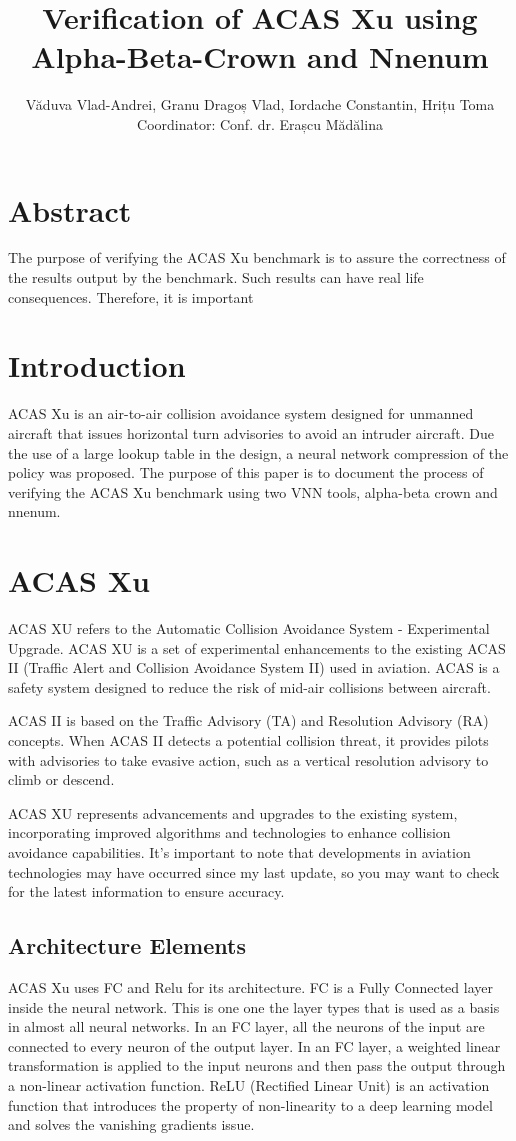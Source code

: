 \documentclass{article}
\title{Verification of ACAS Xu using Alpha-Beta-Crown and Nnenum }
\author{Văduva Vlad-Andrei, Granu Dragoș Vlad, Iordache Constantin, Hrițu Toma\\[1cm]{\small Coordinator: Conf. dr. Erașcu Mădălina}}
\begin{document}
\maketitle
\newpage
\tableofcontents
\clearpage
\section{Abstract}
The purpose of verifying the ACAS Xu benchmark is to assure the correctness of the results output by the benchmark. Such results can have real life consequences. Therefore, it is important 
\section{Introduction}
ACAS Xu is an air-to-air collision avoidance system designed for unmanned aircraft that issues horizontal turn advisories to avoid an intruder aircraft. Due the use of a large lookup table in the design, a neural network compression of the policy was proposed. The purpose of this paper is to document the process of verifying the ACAS Xu benchmark using two VNN tools, alpha-beta crown and nnenum.
\section{ACAS Xu }
ACAS XU refers to the Automatic Collision Avoidance System - Experimental Upgrade. ACAS XU is a set of experimental enhancements to the existing ACAS II (Traffic Alert and Collision Avoidance System II) used in aviation. ACAS is a safety system designed to reduce the risk of mid-air collisions between aircraft.

ACAS II is based on the Traffic Advisory (TA) and Resolution Advisory (RA) concepts. When ACAS II detects a potential collision threat, it provides pilots with advisories to take evasive action, such as a vertical resolution advisory to climb or descend.

ACAS XU represents advancements and upgrades to the existing system, incorporating improved algorithms and technologies to enhance collision avoidance capabilities. It's important to note that developments in aviation technologies may have occurred since my last update, so you may want to check for the latest information to ensure accuracy.

\subsection{Architecture Elements}
ACAS Xu uses FC and Relu for its architecture.\newline
FC is a Fully Connected layer inside the neural network. This is one one the layer types that is used as a basis in almost all neural networks. In an FC layer, all the neurons of the input are connected to every neuron of the output layer. In an FC layer, a weighted linear transformation is applied to the input neurons and then pass the output through a non-linear activation function.
\newline
ReLU (Rectified Linear Unit) is an activation function that introduces the property of non-linearity to a deep learning model and solves the vanishing gradients issue.
\newpage
\end{document}
